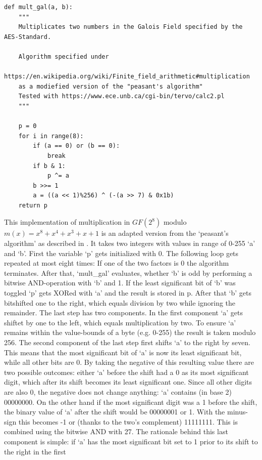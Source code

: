 \begin{lstlisting}
def mult_gal(a, b):
    """
    Multiplicates two numbers in the Galois Field specified by the AES-Standard.

    Algorithm specified under
    https://en.wikipedia.org/wiki/Finite_field_arithmetic#multiplication
    as a modiefied version of the "peasant's algorithm"
    Tested with https://www.ece.unb.ca/cgi-bin/tervo/calc2.pl
    """
    
    p = 0
    for i in range(8):
        if (a == 0) or (b == 0):
            break
        if b & 1:
            p ^= a
        b >>= 1
        a = ((a << 1)%256) ^ (-(a >> 7) & 0x1b)
    return p
\end{lstlisting}

This implementation of multiplication in $GF(2^{8})$ modulo $m(x) = x^8 + x^4 +
x^3 + x + 1$ is an adapted version from the `peasant's algorithm' as
described in
\cite{peasants}.
It takes two integers with values in range of 0-255 `a' and `b'. First
the variable `p' gets initialized with 0. The following loop gets
repeated at most eight times: If one of the two factors is 0 the
algorithm terminates. After that, `mult\_gal' evaluates, whether `b' is
odd by performing a bitwise AND-operation with `b' and 1. If the least
significant bit of `b' was toggled `p' gets XORed with `a' and the
result is stored in p. After that `b' gets bitshifted one to the right,
which equals division by two while ignoring the remainder. The last step
has two components. In the first component `a' gets shiftet by one to
the left, which equals multiplication by two. To ensure `a' remains
within the value-bounds of a byte (e.g. 0-255) the result is taken
modulo 256. The second component of the last step first shifts `a' to
the right by seven. This means that the most significant bit of `a' is
now its least significant bit, while all other bits are 0. By taking the
negative of this resulting value there are two possible outcomes: either
`a' before the shift had a 0 as its most significant digit, which after
its shift becomes its least significant one. Since all other digits are
also 0, the negative does not change anything: `a' contains (in base 2)
00000000. On the other hand if the most significant digit was a 1 before
the shift, the binary value of `a' after the shift would be 00000001 or
1. With the minus-sign this becomes -1 or (thanks to the two's
complement) 11111111. This is combined using the bitwise AND with 27.
The rationale behind this last component is simple: if `a' has the most
significant bit set to 1 prior to its shift to the right in the first
